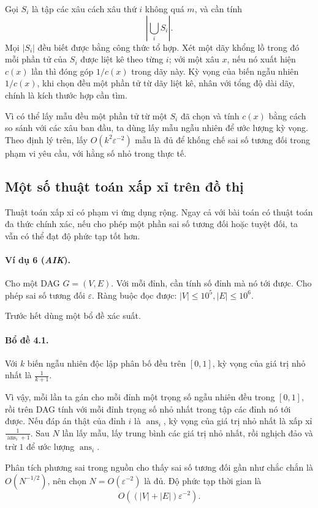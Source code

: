 \documentclass[11pt]{article}
\begin{document}
Gọi $S_i$ là tập các xâu cách xâu thứ $i$ không quá $m$, và cần tính
\[
  \left|\bigcup_i S_i\right|.
\]
Mọi $|S_i|$ đều biết được bằng công thức tổ hợp. Xét một dãy khổng lồ trong đó
mỗi phần tử của $S_i$ được liệt kê theo từng $i$; với một xâu $x$, nếu nó xuất
hiện $c(x)$ lần thì đóng góp $1/c(x)$ trong dãy này. Kỳ vọng của biến ngẫu
nhiên $1/c(x)$, khi chọn đều một phần tử từ dãy liệt kê, nhân với tổng độ dài
dãy, chính là kích thước hợp cần tìm.

Vì có thể lấy mẫu đều một phần tử từ một $S_i$ đã chọn và tính $c(x)$ bằng cách
so sánh với các xâu ban đầu, ta dùng lấy mẫu ngẫu nhiên để ước lượng kỳ vọng.
Theo định lý trên, lấy $O(k^2\varepsilon^{-2})$ mẫu là đủ để khống chế sai số
tương đối trong phạm vi yêu cầu, với hằng số nhỏ trong thực tế.

\subsection{Một số thuật toán xấp xỉ trên đồ thị}

Thuật toán xấp xỉ có phạm vi ứng dụng rộng. Ngay cả với bài toán có thuật toán
đa thức chính xác, nếu cho phép một phần sai số tương đối hoặc tuyệt đối, ta vẫn
có thể đạt độ phức tạp tốt hơn.

\paragraph{Ví dụ 6 (\emph{AIK}).}
Cho một DAG $G=(V,E)$. Với mỗi đỉnh, cần tính số đỉnh mà nó tới được. Cho phép
sai số tương đối $\varepsilon$. Ràng buộc đọc được:
$|V|\le10^5, |E|\le10^6$.

Trước hết dùng một bổ đề xác suất.

\paragraph{Bổ đề 4.1.}
Với $k$ biến ngẫu nhiên độc lập phân bố đều trên $[0,1]$, kỳ vọng của giá trị
nhỏ nhất là $\frac1{k+1}$.

Vì vậy, mỗi lần ta gán cho mỗi đỉnh một trọng số ngẫu nhiên đều trong $[0,1]$,
rồi trên DAG tính với mỗi đỉnh trọng số nhỏ nhất trong tập các đỉnh nó tới
được. Nếu đáp án thật của đỉnh $i$ là $\operatorname{ans}_i$, kỳ vọng của giá
trị nhỏ nhất là xấp xỉ $\frac1{\operatorname{ans}_i+1}$. Sau $N$ lần lấy mẫu,
lấy trung bình các giá trị nhỏ nhất, rồi nghịch đảo và trừ $1$ để ước lượng
$\operatorname{ans}_i$.

Phân tích phương sai trong nguồn cho thấy sai số tương đối gần như chắc chắn là
$O(N^{-1/2})$, nên chọn $N=O(\varepsilon^{-2})$ là đủ. Độ phức tạp thời gian là
\[
  O((|V|+|E|)\varepsilon^{-2}).
\]
\end{document}

